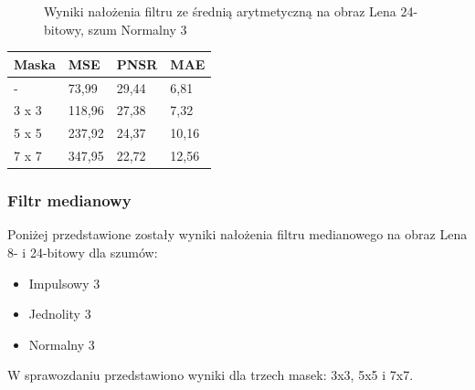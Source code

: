 \documentclass{classrep}
\begin{document}
\begin{figure}[H]%
    \centering
    \qquad
    \qquad
    \qquad
    \caption{Wyniki nałożenia filtru ze średnią arytmetyczną na obraz Lena 24-bitowy, szum Normalny 3}%
\end{figure}

\begin{center}
    \begin{tabular}{| l | l | l | l |}
    \hline
    Maska & MSE & PNSR & MAE \\ \hline
    - & 73,99 & 29,44 & 6,81 \\ \hline
    3 x 3 & 118,96 & 27,38 & 7,32 \\ \hline
    5 x 5 & 237,92 & 24,37 & 10,16 \\ \hline
    7 x 7 & 347,95 & 22,72 & 12,56 \\ \hline
    \end{tabular}
\end{center}

\subsubsection{Filtr medianowy}
Poniżej przedstawione zostały wyniki nałożenia filtru medianowego na obraz Lena 8- i 24-bitowy dla szumów:
\begin{itemize}
\item Impulsowy 3
\item Jednolity 3
\item Normalny 3
\end{itemize}
W sprawozdaniu przedstawiono wyniki dla trzech masek: 3x3, 5x5 i 7x7.
\end{document}
